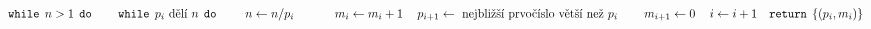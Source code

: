 \documentclass[preview]{standalone}
\begin{document}
\begin{align*}
& \mathtt{while}  \:\: n > 1 \:\:  \mathtt{do} &\hspace*{12pt} \mathtt{while}  \:\: p_i \text{ dělí } n \:\:  \mathtt{do} &\hspace*{24pt}n \leftarrow n / p_i &\hspace*{24pt}m_i \leftarrow m_i + 1 &\hspace*{12pt}p_{i+1} \leftarrow \text{ nejbližší prvočíslo větší než } p_i &\hspace*{12pt}m_{i+1} \leftarrow 0 &\hspace*{12pt}i \leftarrow i + 1 & \mathtt{return}  \:\: \{(p_i, m_i)\}
\end{align*}
\end{document}
